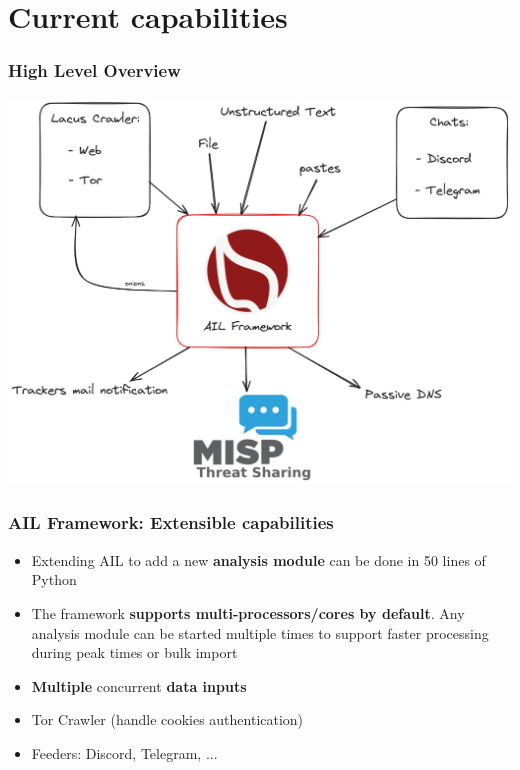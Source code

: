 \documentclass[aspectratio=169]{beamer}
\begin{document}
\section{Current capabilities}

\begin{frame}
    \frametitle{High Level Overview}
    \begin{center}
        \includegraphics[scale=0.22]{images/ail-overview.png}
    \end{center}
\end{frame}


\begin{frame}
    \frametitle{AIL Framework: Extensible capabilities}
    \begin{itemize}
        \item Extending AIL to add a new {\bf analysis module} can be done in 50 lines of Python
        \item The framework {\bf supports multi-processors/cores by default}. Any analysis module can be started multiple times to support faster processing during peak times or bulk import
        \item \textbf{Multiple} concurrent \textbf{data inputs}
        \item Tor Crawler (handle cookies authentication)
        \item Feeders: Discord, Telegram, ...
    \end{itemize}
\end{frame}
\end{document}
